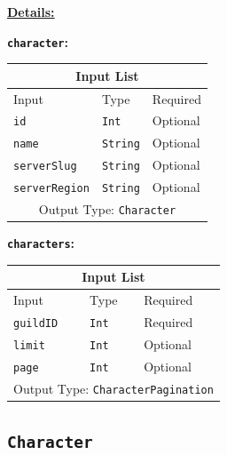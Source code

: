 \documentclass[10pt, a4paper]{memoir}
\numberwithin{equation}{section}
\theoremstyle{plain}
\theoremstyle{defp}
\theoremstyle{dotless}
\theoremstyle{definition}
\theoremstyle{dotless}
\theoremstyle{dotless}
\theoremstyle{defp}
\theoremstyle{defp}
\theoremstyle{be}          %
\theoremstyle{defp}
\newcommand\ttt[1]{\texttt{#1}}
\begin{document}
\underline{\textbf{Details:}}

\textbf{\ttt{character}:}

\begin{table}[h]
	\centering
	\begin{tabular}{ |p{3cm}|p{3cm}|p{3cm}|  }
		\hline
		\multicolumn{3}{|c|}{Input List} \\
		\hline
		Input & Type & Required\\
		\hline
		\ttt{id}   & \ttt{Int} & Optional\\
		\ttt{name}& \ttt{String} & Optional\\
		\ttt{serverSlug} & \ttt{String} & Optional\\
		\ttt{serverRegion}    & \ttt{String} & Optional\\
		\hline
		\multicolumn{3}{|c|}{Output Type: \ttt{Character}} \\
		\hline
	\end{tabular}
\end{table}



\smallskip

\textbf{\ttt{characters}:}

\begin{table}[h]
	\centering
	\begin{tabular}{ |p{3cm}|p{3cm}|p{3cm}|  }
		\hline
		\multicolumn{3}{|c|}{Input List} \\
		\hline
		Input & Type & Required\\
		\hline
		\ttt{guildID}   & \ttt{Int} & Required\\
		\ttt{limit}& \ttt{Int} & Optional\\
		\ttt{page} & \ttt{Int} & Optional\\
		\hline
		\multicolumn{3}{|c|}{Output Type: \ttt{CharacterPagination}} \\
		\hline
	\end{tabular}
\end{table}

\subsection{\ttt{Character}}\label{sec:Character}
\end{document}
